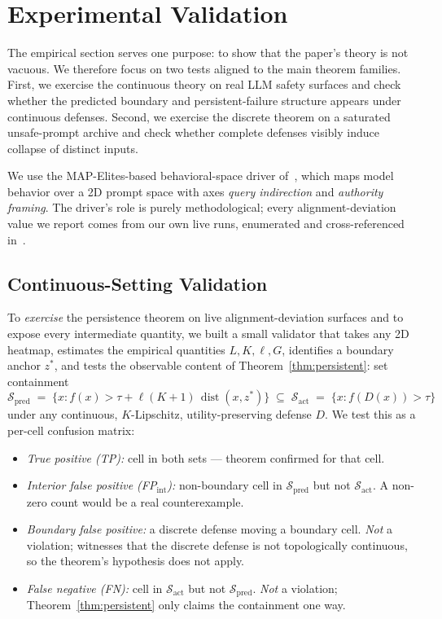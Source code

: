 \documentclass[11pt]{article}
\newcommand{\dist}{\operatorname{dist}}
\begin{document}
\section{Experimental Validation}
\label{sec:experiments}

The empirical section serves one purpose: to show that the paper's
theory is not vacuous. We therefore focus on two tests aligned to the
main theorem families. First, we exercise the continuous theory on
real LLM safety surfaces and check whether the predicted boundary and
persistent-failure structure appears under continuous defenses.
Second, we exercise the discrete theorem on a saturated unsafe-prompt
archive and check whether complete defenses visibly induce collapse of
distinct inputs.

We use the MAP-Elites-based behavioral-space driver
of~\cite{munshi2026manifold}, which maps model behavior over a 2D
prompt space with axes \emph{query indirection} and \emph{authority
framing}. The driver's role is purely methodological; every
alignment-deviation value we report comes from our own live runs,
enumerated and cross-referenced in~.

\subsection{Continuous-Setting Validation}
\label{sec:live-validation}

To \emph{exercise} the persistence theorem on
live alignment-deviation surfaces and to expose every intermediate
quantity, we built a small validator
that takes any 2D heatmap, estimates the empirical quantities
$L, K, \ell, G$, identifies a boundary anchor $z^{*}$, and tests
the observable content of Theorem~\ref{thm:persistent}:
set containment
\[
\mathcal{S}_{\text{pred}} \;=\;
\bigl\{x : f(x) > \tau + \ell(K{+}1)\,\dist(x, z^{*})\bigr\}
\;\subseteq\;
\mathcal{S}_{\text{act}} \;=\; \bigl\{x : f(D(x)) > \tau\bigr\}
\]
under any continuous, $K$-Lipschitz, utility-preserving defense
$D$. We test this as a per-cell confusion matrix:

\begin{itemize}[nosep]
  \item \emph{True positive (TP):} cell in both sets — theorem
    confirmed for that cell.
  \item \emph{Interior false positive (FP$_{\mathrm{int}}$):} non-boundary
    cell in $\mathcal{S}_{\text{pred}}$ but not $\mathcal{S}_{\text{act}}$.
    A non-zero count would be a real counterexample.
  \item \emph{Boundary false positive:} a discrete defense moving a
    boundary cell. \emph{Not} a violation; witnesses that the discrete
    defense is not topologically continuous, so the theorem's
    hypothesis does not apply.
  \item \emph{False negative (FN):} cell in $\mathcal{S}_{\text{act}}$
    but not $\mathcal{S}_{\text{pred}}$. \emph{Not} a violation;
    Theorem~\ref{thm:persistent} only claims the containment one way.
\end{itemize}
\end{document}
